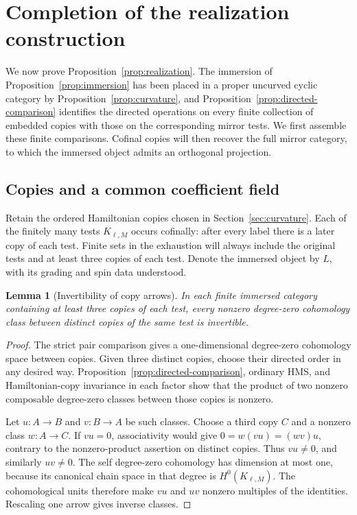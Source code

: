\documentclass[11pt]{article}
\numberwithin{equation}{section}
\newtheorem{lemma}[theorem]{Lemma}
\theoremstyle{definition}
\theoremstyle{remark}
\begin{document}
\section{Completion of the realization construction}
\label{sec:realization}

We now prove Proposition~\ref{prop:realization}.  The immersion of
Proposition~\ref{prop:immersion} has been placed in a proper uncurved
cyclic category by Proposition~\ref{prop:curvature}, and
Proposition~\ref{prop:directed-comparison}
identifies the directed operations on every finite collection of
embedded copies with those on the corresponding mirror tests.
We first assemble these finite comparisons.  Cofinal copies will then
recover the full mirror category, to which the immersed object admits
an orthogonal projection.

\subsection{Copies and a common coefficient field}

Retain the ordered Hamiltonian copies chosen in
Section~\ref{sec:curvature}.  Each of the finitely many tests
$K_{\ell,M}$ occurs cofinally: after every label there is a later copy
of each test.
Finite sets in the exhaustion will always include the original tests
and at least three copies of each test.  Denote
the immersed object by $L$, with its grading and spin data understood.

\begin{lemma}[Invertibility of copy arrows]
\label{realization:copies}
In each finite immersed category containing at least three copies of
each test, every nonzero degree-zero cohomology class between distinct
copies of the same test is invertible.
\end{lemma}

\begin{proof}
The strict pair comparison gives a one-dimensional degree-zero
cohomology space between copies.  Given three distinct copies, choose
their directed order in any desired way.
Proposition~\ref{prop:directed-comparison}, ordinary HMS, and
Hamiltonian-copy invariance in each factor show that the product of two
nonzero composable degree-zero classes between those copies is nonzero.

Let $u:A\to B$ and $v:B\to A$ be such classes.  Choose a third copy $C$
and a nonzero class $w:A\to C$.  If $vu=0$, associativity would give
$0=w(vu)=(wv)u$, contrary to the nonzero-product assertion on distinct
copies.  Thus $vu\ne0$, and similarly $uv\ne0$.  The self degree-zero
cohomology has dimension at most one, because its canonical chain space
in that degree is $H^0(K_{\ell,M})$.  The cohomological units therefore
make $vu$ and $uv$ nonzero multiples of the identities.  Rescaling one
arrow gives inverse classes.
\end{proof}
\end{document}
